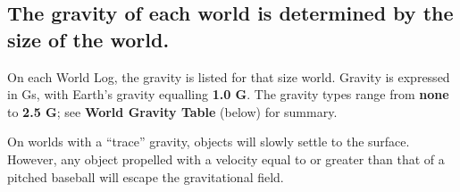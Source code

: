 \renewcommand{\thetable}{\thesection C}
\begin{table}[htbp]
  \centering
\end{table}
\renewcommand{\thetable}{\thesection}

\subsection[Gravity]{The gravity of each world is determined by the
  size of the world.}
\label{sec:gravity}

On each World Log, the gravity is listed for that size world. Gravity
is expressed in Gs, with Earth's gravity equalling \textbf{1.0 G}. The
gravity types range from \textbf{none} to \textbf{2.5 G}; see
\textbf{World Gravity Table} (below) for summary.

On worlds with a ``trace'' gravity, objects will slowly settle to the
surface. However, any object propelled with a velocity equal to or
greater than that of a pitched baseball will escape the gravitational
field.

